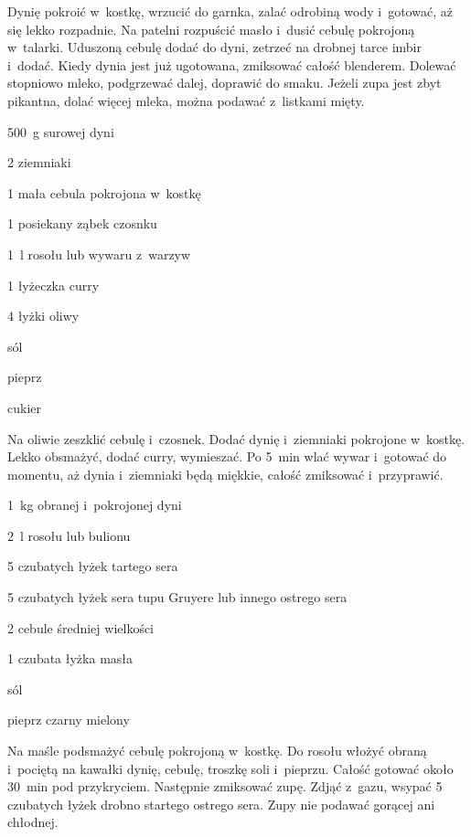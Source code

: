 \documentclass[main.tex]{subfiles}
\begin{document}
Dynię pokroić w~kostkę, wrzucić do garnka, zalać odrobiną wody i~gotować, aż
się lekko rozpadnie. Na patelni rozpuścić masło i~dusić cebulę pokrojoną
w~talarki. Uduszoną cebulę dodać do dyni, zetrzeć na drobnej tarce imbir
i~dodać. Kiedy dynia jest już ugotowana, zmiksować całość blenderem. Dolewać
stopniowo mleko, podgrzewać dalej, doprawić do smaku. Jeżeli zupa jest zbyt
pikantna, dolać więcej mleka, można podawać z~listkami mięty.


\begin{Ingred}
    \item \qty{500}{\gram} surowej dyni
    \item \num{2} ziemniaki
    \item \num{1} mała cebula pokrojona w~kostkę
    \item \num{1} posiekany ząbek czosnku
    \item \qty{1}{\litre} rosołu lub wywaru z~warzyw
    \item \num{1} łyżeczka curry
    \item \num{4} łyżki oliwy
    \item sól
    \item pieprz
    \item cukier
\end{Ingred}

Na oliwie zeszklić cebulę i~czosnek. Dodać dynię i~ziemniaki pokrojone
w~kostkę. Lekko obsmażyć, dodać curry, wymieszać. Po \qty{5}{\minute} wlać
wywar i~gotować do momentu, aż dynia i~ziemniaki będą miękkie, całość zmiksować
i~przyprawić.


\begin{Ingred}
    \item \qty{1}{\kilo\gram} obranej i~pokrojonej dyni
    \item \qty{2}{\litre} rosołu lub bulionu
    \item \num{5} czubatych łyżek tartego sera
    \item \num{5} czubatych łyżek sera tupu Gruyere lub innego ostrego sera
    \item \num{2} cebule średniej wielkości
    \item \num{1} czubata łyżka masła
    \item sól
    \item pieprz czarny mielony
\end{Ingred}

Na maśle podsmażyć cebulę pokrojoną w~kostkę. Do rosołu włożyć obraną i~pociętą
na kawałki dynię, cebulę, troszkę soli i~pieprzu. Całość gotować około
\qty{30}{\minute} pod przykryciem. Następnie zmiksować zupę. Zdjąć z~gazu,
wsypać 5 czubatych łyżek drobno startego ostrego sera. Zupy nie podawać gorącej
ani chłodnej.
\end{document}

